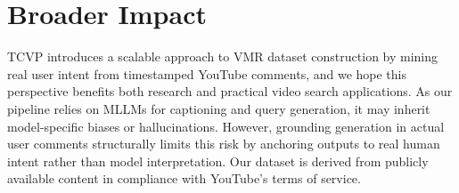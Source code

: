 \documentclass[11pt]{article}
\begin{document}
\section*{Broader Impact}                                     
TCVP introduces a scalable approach to VMR dataset construction by mining real user intent from timestamped YouTube comments, and we hope this perspective benefits both research and practical video search applications. As our pipeline relies on MLLMs for captioning and query generation, it may inherit model-specific biases or hallucinations. 
However, grounding generation in actual user comments structurally limits this risk by anchoring outputs to real human intent rather than model interpretation. Our dataset is derived from publicly available content in compliance with YouTube's terms of service.
\end{document}
